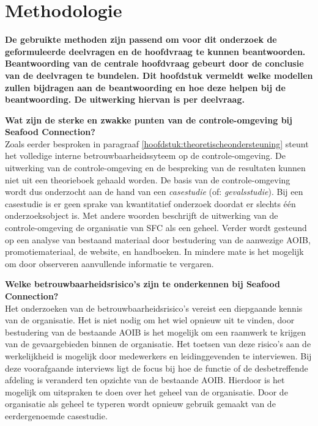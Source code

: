 \chapter{Methodologie}
\label{hoofdstuk:methodologie}
\textbf{De gebruikte methoden zijn passend om voor dit onderzoek de geformuleerde deelvragen en de hoofdvraag te kunnen beantwoorden. Beantwoording van de centrale hoofdvraag gebeurt door de conclusie van de deelvragen te bundelen. Dit hoofdstuk vermeldt welke modellen zullen bijdragen aan de beantwoording en hoe deze helpen bij de beantwoording. De uitwerking hiervan is per deelvraag.}

\bigskip \noindent
\textbf{Wat zijn de sterke en zwakke punten van de controle-omgeving bij Seafood Connection?} \\
Zoals eerder besproken in paragraaf \ref{hoofdstuk:theoretischeondersteuning} steunt het volledige interne betrouwbaarheidssyteem op de controle-omgeving. De uitwerking van de controle-omgeving en de bespreking van de resultaten kunnen niet uit een theorieboek gehaald worden. De basis van de controle-omgeving wordt dus onderzocht aan de hand van een \emph{casestudie} (of: \emph{gevalsstudie}). Bij een casestudie is er geen sprake van kwantitatief onderzoek doordat er slechts één onderzoeksobject is. Met andere woorden beschrijft de uitwerking van de controle-omgeving de organisatie van SFC als een geheel. Verder wordt gesteund op een analyse van bestaand materiaal door bestudering van de aanwezige AOIB, promotiemateriaal, de website, en handboeken. In mindere mate is het mogelijk om door observeren aanvullende informatie te vergaren. 

\vfill
\begin{center}
\end{center}

\bigskip \noindent 
\textbf{Welke betrouwbaarheidsrisico's zijn te onderkennen bij Seafood Connection?} \\
Het onderzoeken van de betrouwbaarheidsrisico's vereist een diepgaande kennis van de organisatie. Het is niet nodig om het wiel opnieuw uit te vinden, door bestudering van de bestaande AOIB is het mogelijk om een raamwerk te krijgen van de gevaargebieden binnen de organisatie. Het toetsen van deze risico's aan de werkelijkheid is mogelijk door medewerkers en leidinggevenden te interviewen. Bij deze voorafgaande interviews ligt de focus bij hoe de functie of de desbetreffende afdeling is veranderd ten opzichte van de bestaande AOIB. Hierdoor is het mogelijk om uitspraken te doen over het geheel van de organisatie. Door de organisatie als geheel te typeren wordt opnieuw gebruik gemaakt van de eerdergenoemde casestudie. 

